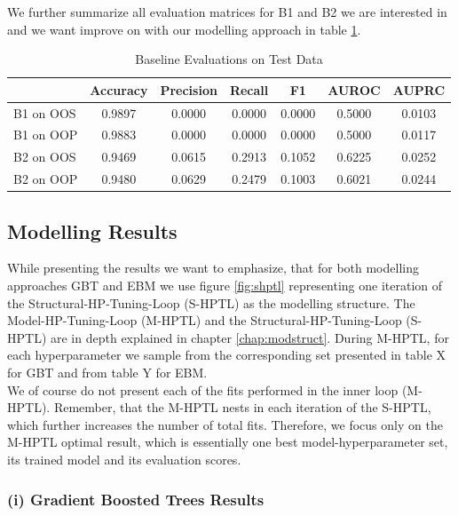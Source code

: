 \documentclass[12pt,titlepage]{article}
\begin{document}
\vspace{5mm}
We further summarize all evaluation matrices for B1 and B2 we are interested in and we want improve on with our modelling approach in table \ref{tab:baseline}. \\
\noindent
\setlength{\tabcolsep}{5pt}
\renewcommand{\arraystretch}{1.2}
\begin{table}[H]
    \centering
    \begin{tabular}{|l|cccccc|}
    \hline
              & Accuracy & Precision & Recall &   F1   & AUROC & AUPRC  \\
    \hline
    B1 on OOS &  0.9897  &   0.0000  & 0.0000 & 0.0000 & 0.5000 & 0.0103 \\
    B1 on OOP &  0.9883  &   0.0000  & 0.0000 & 0.0000 & 0.5000 & 0.0117 \\
    \hline
    B2 on OOS &  0.9469  &   0.0615  & 0.2913 & 0.1052 & 0.6225 & 0.0252 \\
    B2 on OOP &  0.9480  &   0.0629  & 0.2479 & 0.1003 & 0.6021 & 0.0244 \\
    \hline
    \end{tabular}
    \caption{Baseline Evaluations on Test Data}
    \label{tab:baseline}
\end{table}

\subsection{Modelling Results} \par

While presenting the results we want to emphasize, that for both modelling approaches GBT and EBM we use figure \ref{fig:shptl} representing one iteration of the Structural-HP-Tuning-Loop (S-HPTL) as the modelling structure. The Model-HP-Tuning-Loop (M-HPTL) and the Structural-HP-Tuning-Loop (S-HPTL) are in depth explained in chapter \ref{chap:modstruct}. During M-HPTL, for each hyperparameter we sample from the corresponding set presented in table X for GBT and from table Y for EBM. \\
We of course do not present each of the fits performed in the inner loop (M-HPTL). Remember, that the M-HPTL nests in each iteration of the S-HPTL, which further increases the number of total fits. Therefore, we focus only on the M-HPTL optimal result, which is essentially one best model-hyperparameter set, its trained model and its evaluation scores. \\

\subsubsection*{(i) Gradient Boosted Trees Results}
\end{document}
